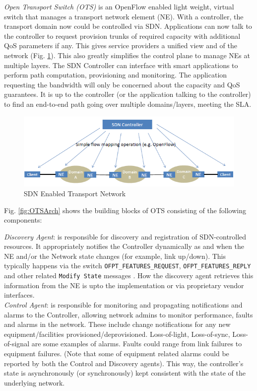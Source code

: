 \documentclass{sig-alternate-2013}
\begin{document}
	\textit{Open Transport Switch (OTS)} is an OpenFlow \cite{OF1.0} enabled light weight, virtual switch
	that manages a transport network element (NE). With a controller, the transport domain now could be
	controlled via SDN. Applications can now talk to the controller to request provision trunks of required
	capacity with additional QoS parameters if any. This gives service providers a unified view and of the
	network (Fig. \ref{fig:MLwOF}). This also greatly simplifies the control plane to manage NEs at multiple
	layers. The SDN Controller can interface with smart applications to perform path computation,
	provisioning and monitoring. The application requesting the bandwidth will only be concerned about the
	capacity and QoS guarantees. It is up to the controller (or the application talking to the controller) to
	find an end-to-end path going over multiple domains/layers, meeting the SLA.
\fi
	\begin{figure}[htb]
	\centering
	\includegraphics[scale=0.50]{MLwOF.png}
	\caption{SDN Enabled Transport Network}
	\label{fig:MLwOF}
	\end{figure}

	Fig. \ref{fig:OTSArch} shows the building blocks of OTS consisting of the following components:

	\textit{Discovery Agent}: is responsible for discovery and registration of SDN-controlled resources. 
		It appropriately notifies the Controller dynamically as and when the NE and/or the Network state changes 
		(for example, link up/down). This typically happens via the switch
		\texttt{OFPT\_FEATURES\_REQUEST}, \texttt{OFPT\_FEATURES\_REPLY} and
		other related \texttt{Modify State} messages \cite{OF1.0}. How the discovery agent retrieves this
		information from the NE is upto the implementation or via proprietary vendor interfaces. \\

	\textit{Control Agent}: is responsible for monitoring and propagating notifications and alarms to the
		Controller, allowing network admins to monitor performance, faults and alarms in the network. 
		These include change notifications for any new equipment/facilities provisioned/deprovisioned. Loss-of-light, Loss-of-sync, Loss-of-signal are some 
		examples of alarms. Faults could range from link failures to equipment failures. (Note that some of
		equipment related alarms could be reported by both the Control and Discovery agents). This way, the
		controller's state is asynchronously (or synchronously) kept consistent with the state of the underlying
		network. \\
\end{document}
